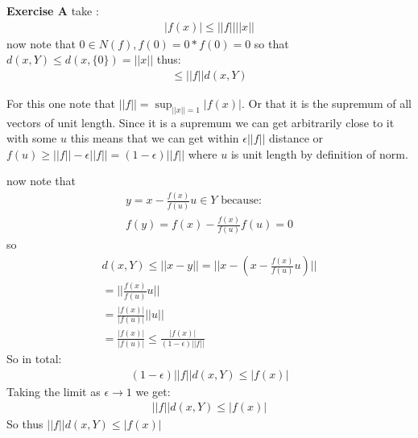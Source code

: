 \documentclass[12pt]{article}
\newenvironment{exercise}[1]{\vspace{.1in}\noindent\textbf{Exercise #1 \hspace{.05em}}}{}
\theoremstyle{definition}
\theoremstyle{remark}
\begin{document}
\begin{exercise}{A}
	take :
	\begin{align}
		|f(x)|\leq ||f||||x||
	\end{align}
	now note that $0\in N(f), f(0)=0*f(0)=0$ so that $d(x,Y)\leq d(x,\{0\})=||x||$ thus:
	\begin{align}
		\leq ||f||d(x,Y)
	\end{align}

	For this one note that $||f||=\sup_{||x||=1}|f(x)|$. Or that it is the supremum of all vectors of unit length. Since it is a supremum we can get arbitrarily close to it with some $u$ this means that we can get within $\epsilon ||f||$ distance or $f(u)\geq ||f||-\epsilon ||f||=(1-\epsilon)||f||$ where $u$ is unit length by definition of norm.

	now note that
	\begin{align}
		y=x-\frac{f(x)}{f(u)}u\in Y \text{ because:} \\
		f(y)=f(x)-\frac{f(x)}{f(u)}f(u)=0
	\end{align}
	so
	\begin{align}
		d(x,Y)\leq ||x-y||=||x-(x-\frac{f(x)}{f(u)}u)|| \\
		=||\frac{f(x)}{f(u)}u||                         \\
		=\frac{|f(x)|}{|f(u)|}||u||                     \\
		=\frac{|f(x)|}{|f(u)|}
		\leq \frac{|f(x)|}{(1-\epsilon)||f||}
	\end{align}
	So in total:
	\begin{align}
		(1-\epsilon)||f|| d(x,Y)\leq |f(x)|
	\end{align}
	Taking the limit as $\epsilon \rightarrow 1$ we get:
	\begin{align}
		||f||d(x,Y)\leq |f(x)|
	\end{align}
	So thus  $||f||d(x,Y)\leq|f(x)|$

\end{exercise}
\end{document}
